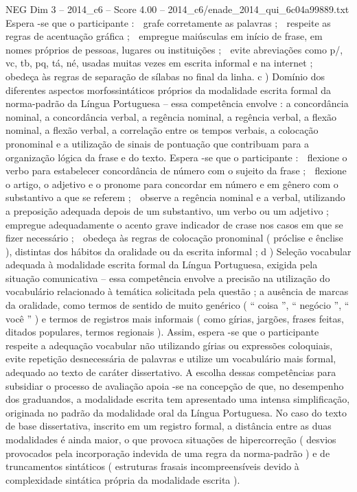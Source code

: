 \begin{textsample}{NEG Dim 3 – 2014\_c6 – Score 4.00 – 2014\_c6/enade\_2014\_qui\_6c04a99889.txt}
Espera -se que o participante :  grafe corretamente as palavras ;  respeite as regras de acentuação gráfica ;  empregue maiúsculas em início de frase, em nomes próprios de pessoas, lugares ou instituições ;  evite abreviações como p/, vc, tb, pq, tá, né, usadas muitas vezes em escrita informal e na internet ;  obedeça às regras de separação de sílabas no final da linha. c ) Domínio dos diferentes aspectos morfossintáticos próprios da modalidade escrita formal da norma-padrão da Língua Portuguesa – essa competência envolve : a concordância nominal, a concordância verbal, a regência nominal, a regência verbal, a flexão nominal, a flexão verbal, a correlação entre os tempos verbais, a colocação pronominal e a utilização de sinais de pontuação que contribuam para a organização lógica da frase e do texto.
Espera -se que o participante :  flexione o verbo para estabelecer concordância de número com o sujeito da frase ;  flexione o artigo, o adjetivo e o pronome para concordar em número e em gênero com o substantivo a que se referem ;  observe a regência nominal e a verbal, utilizando a preposição adequada depois de um substantivo, um verbo ou um adjetivo ;  empregue adequadamente o acento grave indicador de crase nos casos em que se fizer necessário ;  obedeça às regras de colocação pronominal ( próclise e ênclise ), distintas dos hábitos da oralidade ou da escrita informal ; d ) Seleção vocabular adequada à modalidade escrita formal da Língua Portuguesa, exigida pela situação comunicativa – essa competência envolve a precisão na utilização do vocabulário relacionado à temática solicitada pela questão ; a ausência de marcas da oralidade, como termos de sentido de muito genérico ( “ coisa ”, “ negócio ”, “ você ” ) e termos de registros mais informais ( como gírias, jargões, frases feitas, ditados populares, termos regionais ).
Assim, espera -se que o participante respeite a adequação vocabular não utilizando gírias ou expressões coloquiais, evite repetição desnecessária de palavras e utilize um vocabulário mais formal, adequado ao texto de caráter dissertativo.
A escolha dessas competências para subsidiar o processo de avaliação apoia -se na concepção de que, no desempenho dos graduandos, a modalidade escrita tem apresentado uma intensa simplificação, originada no padrão da modalidade oral da Língua Portuguesa.
No caso do texto de base dissertativa, inscrito em um registro formal, a distância entre as duas modalidades é ainda maior, o que provoca situações de hipercorreção ( desvios provocados pela incorporação indevida de uma regra da norma-padrão ) e de truncamentos sintáticos ( estruturas frasais incompreensíveis devido à complexidade sintática própria da modalidade escrita ).

\end{textsample}
